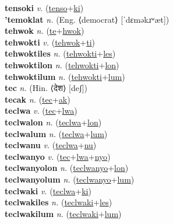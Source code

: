 \textbf{tensoki} \textit{v.} (\hyperref[tenso]{tenso}+\hyperref[ki]{ki})
 \label{tensoki} \\
\textbf{'temoklat} \textit{n.} (Eng. ⟨democrat⟩ [ˈdɛməkɹʷæt])
 \label{'temoklat} \\
\textbf{tehwok} \textit{n.} (\hyperref[te]{te}+\hyperref[hwok]{hwok})
 \label{tehwok} \\
\textbf{tehwokti} \textit{v.} (\hyperref[tehwok]{tehwok}+\hyperref[ti]{ti})
 \label{tehwokti} \\
\textbf{tehwoktiles} \textit{n.} (\hyperref[tehwokti]{tehwokti}+\hyperref[les]{les})
 \label{tehwoktiles} \\
\textbf{tehwoktilon} \textit{n.} (\hyperref[tehwokti]{tehwokti}+\hyperref[lon]{lon})
 \label{tehwoktilon} \\
\textbf{tehwoktilum} \textit{n.} (\hyperref[tehwokti]{tehwokti}+\hyperref[lum]{lum})
 \label{tehwoktilum} \\
\textbf{tec} \textit{n.} (Hin. ⟨देश⟩ [deʃ])
 \label{tec} \\
\textbf{tecak} \textit{n.} (\hyperref[tec]{tec}+\hyperref[ak]{ak})
 \label{tecak} \\
\textbf{teclwa} \textit{v.} (\hyperref[tec]{tec}+\hyperref[lwa]{lwa})
 \label{teclwa} \\
\textbf{teclwalon} \textit{n.} (\hyperref[teclwa]{teclwa}+\hyperref[lon]{lon})
 \label{teclwalon} \\
\textbf{teclwalum} \textit{n.} (\hyperref[teclwa]{teclwa}+\hyperref[lum]{lum})
 \label{teclwalum} \\
\textbf{teclwanu} \textit{v.} (\hyperref[teclwa]{teclwa}+\hyperref[nu]{nu})
 \label{teclwanu} \\
\textbf{teclwanyo} \textit{v.} (\hyperref[tec]{tec}+\hyperref[lwa]{lwa}+\hyperref[nyo]{nyo})
 \label{teclwanyo} \\
\textbf{teclwanyolon} \textit{n.} (\hyperref[teclwanyo]{teclwanyo}+\hyperref[lon]{lon})
 \label{teclwanyolon} \\
\textbf{teclwanyolum} \textit{n.} (\hyperref[teclwanyo]{teclwanyo}+\hyperref[lum]{lum})
 \label{teclwanyolum} \\
\textbf{teclwaki} \textit{v.} (\hyperref[teclwa]{teclwa}+\hyperref[ki]{ki})
 \label{teclwaki} \\
\textbf{teclwakiles} \textit{n.} (\hyperref[teclwaki]{teclwaki}+\hyperref[les]{les})
 \label{teclwakiles} \\
\textbf{teclwakilum} \textit{n.} (\hyperref[teclwaki]{teclwaki}+\hyperref[lum]{lum})
 \label{teclwakilum} \\
